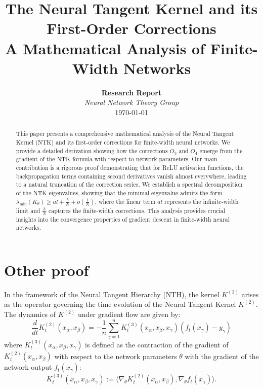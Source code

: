 \documentclass[11pt,a4paper]{article}
\title{\LARGE\textbf{The Neural Tangent Kernel and its First-Order Corrections}\\
\vspace{0.5cm}
\large A Mathematical Analysis of Finite-Width Networks}
\author{
\textbf{Research Report}\\
\vspace{0.3cm}
\textit{Neural Network Theory Group}\\
\vspace{0.2cm}
\today
}
\date{}
\theoremstyle{definition}
\begin{document}
\maketitle

\begin{abstract}
This paper presents a comprehensive mathematical analysis of the Neural Tangent Kernel (NTK) and its first-order corrections for finite-width neural networks. We provide a detailed derivation showing how the corrections $O_3$ and $O_4$ emerge from the gradient of the NTK formula with respect to network parameters. Our main contribution is a rigorous proof demonstrating that for ReLU activation functions, the backpropagation terms containing second derivatives vanish almost everywhere, leading to a natural truncation of the correction series. We establish a spectral decomposition of the NTK eigenvalues, showing that the minimal eigenvalue admits the form $\lambda_{\min}(K_\theta) \geq al + \frac{b}{N} + o(\frac{1}{N})$, where the linear term $al$ represents the infinite-width limit and $\frac{b}{N}$ captures the finite-width corrections. This analysis provides crucial insights into the convergence properties of gradient descent in finite-width neural networks.
\end{abstract}

\vspace{1cm}

\tableofcontents

\newpage


\section{Other proof}

In the framework of the Neural Tangent Hierarchy (NTH), the kernel $K^{(3)}$ arises as the operator governing the time evolution of the Neural Tangent Kernel $K^{(2)}$. The dynamics of $K^{(2)}$ under gradient flow are given by:
\begin{equation}
\frac{d}{dt} K^{(2)}_t(x_\alpha, x_\beta) = -\frac{1}{n} \sum_{\gamma=1}^n K^{(3)}_t(x_\alpha, x_\beta, x_\gamma) (f_t(x_\gamma) - y_\gamma)
\end{equation}
where $K^{(3)}_t(x_\alpha, x_\beta, x_\gamma)$ is defined as the contraction of the gradient of $K^{(2)}_t(x_\alpha, x_\beta)$ with respect to the network parameters $\theta$ with the gradient of the network output $f_t(x_\gamma)$:
\begin{equation}
K^{(3)}_t(x_\alpha, x_\beta, x_\gamma) := \langle \nabla_\theta K^{(2)}_t(x_\alpha, x_\beta), \nabla_\theta f_t(x_\gamma) \rangle.
\end{equation}
\end{document}
